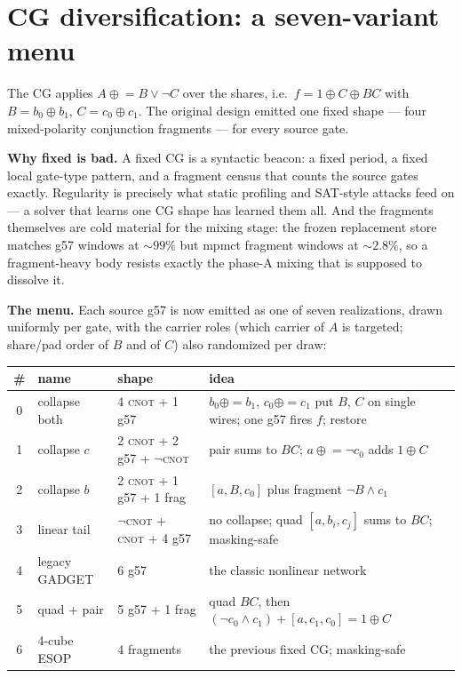 \documentclass[11pt]{article}
\newcommand{\CNOT}{\textsc{cnot}}
\begin{document}
\section{CG diversification: a seven-variant menu}

The CG applies $A \mathrel{\oplus}= B \vee \lnot C$ over the shares, i.e.\
$f = 1 \oplus C \oplus BC$ with $B = b_0 \oplus b_1$, $C = c_0 \oplus
c_1$. The original design emitted one fixed shape --- four mixed-polarity
conjunction fragments --- for every source gate.

\textbf{Why fixed is bad.} A fixed CG is a syntactic beacon: a fixed
period, a fixed local gate-type pattern, and a fragment census that counts
the source gates exactly. Regularity is precisely what static profiling
and SAT-style attacks feed on --- a solver that learns one CG shape has
learned them all. And the fragments themselves are cold material for the
mixing stage: the frozen replacement store matches g57 windows at
${\sim}99\%$ but mpmct fragment windows at ${\sim}2.8\%$, so a
fragment-heavy body resists exactly the phase-A mixing that is supposed
to dissolve it.

\textbf{The menu.} Each source g57 is now emitted as one of seven
realizations, drawn uniformly per gate, with the carrier roles (which
carrier of $A$ is targeted; share/pad order of $B$ and of $C$) also
randomized per draw:

\begin{center}
\small
\begin{tabular}{cllp{5.6cm}}
\toprule
\# & name & shape & idea \\
\midrule
0 & collapse both & 4 \CNOT{} + 1 g57 & $b_0{\oplus}{=}b_1$, $c_0{\oplus}{=}c_1$ put $B$, $C$ on single wires; one g57 fires $f$; restore \\
1 & collapse $c$ & 2 \CNOT{} + 2 g57 + $\lnot$\CNOT{} & pair sums to $BC$; $a \mathrel{\oplus}= \lnot c_0$ adds $1 \oplus C$ \\
2 & collapse $b$ & 2 \CNOT{} + 1 g57 + 1 frag & $[a,B,c_0]$ plus fragment $\lnot B \wedge c_1$ \\
3 & linear tail & $\lnot$\CNOT{} + \CNOT{} + 4 g57 & no collapse; quad $[a,b_i,c_j]$ sums to $BC$; masking-safe \\
4 & legacy GADGET & 6 g57 & the classic nonlinear network \\
5 & quad + pair & 5 g57 + 1 frag & quad $BC$, then $(\lnot c_0 \wedge c_1) + [a,c_1,c_0] = 1 \oplus C$ \\
6 & 4-cube ESOP & 4 fragments & the previous fixed CG; masking-safe \\
\bottomrule
\end{tabular}
\end{center}
\end{document}
